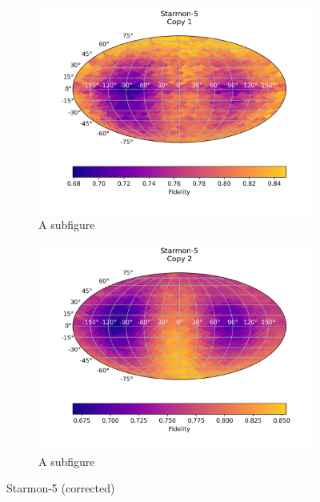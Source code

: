\begin{figure}[H]
    \centering
    \begin{subfigure}{.5\textwidth}
      \centering
      \includegraphics[width=\textwidth]{Figures/PhaseCovariant/Starmon/FullSphere/results_starmon_corrected.txt_copy1.png}
      \caption{A subfigure}
      \label{fig:pc_starmon5_sphere_1_corrected}
    \end{subfigure}%
    \begin{subfigure}{.5\textwidth}
      \centering
      \includegraphics[width=\textwidth]{Figures/PhaseCovariant/Starmon/FullSphere/results_starmon_corrected.txt_copy2.png}
      \caption{A subfigure}
      \label{fig:pc_starmon5_sphere_2_corrected}
    \end{subfigure}
    \caption{Starmon-5 (corrected)}
    \label{fig:pc_starmon5_sphere_corrected}
\end{figure}

